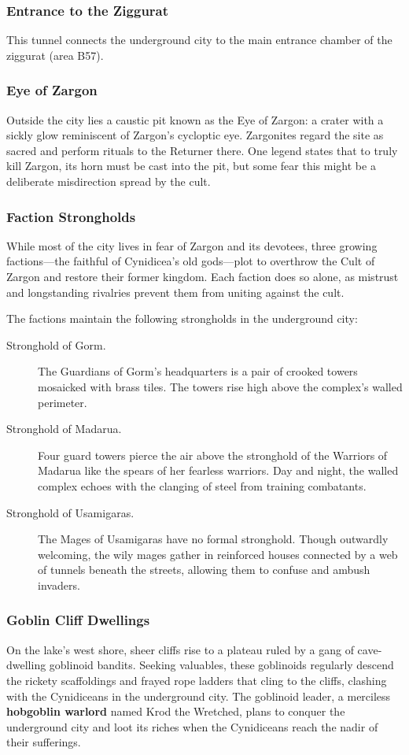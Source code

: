 \documentclass[10pt,a4paper,twoside,bg=print,twocolumn,openany,nodeprecatedcode]{dndbook}
\begin{document}
\subsubsection{Entrance to the Ziggurat}
This tunnel connects the underground city to the main entrance chamber of the ziggurat (area B57).

\subsubsection{Eye of Zargon}
Outside the city lies a caustic pit known as the Eye of Zargon: a crater with a sickly glow reminiscent of Zargon's cycloptic eye. Zargonites regard the site as sacred and perform rituals to the Returner there. One legend states that to truly kill Zargon, its horn must be cast into the pit, but some fear this might be a deliberate misdirection spread by the cult.

\subsubsection{Faction Strongholds}
While most of the city lives in fear of Zargon and its devotees, three growing factions—the faithful of Cynidicea's old gods—plot to overthrow the Cult of Zargon and restore their former kingdom. Each faction does so alone, as mistrust and longstanding rivalries prevent them from uniting against the cult.

The factions maintain the following strongholds in the underground city:


\begin{description}
\item[Stronghold of Gorm.]
The Guardians of Gorm's headquarters is a pair of crooked towers mosaicked with brass tiles. The towers rise high above the complex's walled perimeter.
\item[Stronghold of Madarua.]
Four guard towers pierce the air above the stronghold of the Warriors of Madarua like the spears of her fearless warriors. Day and night, the walled complex echoes with the clanging of steel from training combatants.
\item[Stronghold of Usamigaras.]
The Mages of Usamigaras have no formal stronghold. Though outwardly welcoming, the wily mages gather in reinforced houses connected by a web of tunnels beneath the streets, allowing them to confuse and ambush invaders.
\end{description}

\subsubsection{Goblin Cliff Dwellings}
On the lake's west shore, sheer cliffs rise to a plateau ruled by a gang of cave-dwelling goblinoid bandits. Seeking valuables, these goblinoids regularly descend the rickety scaffoldings and frayed rope ladders that cling to the cliffs, clashing with the Cynidiceans in the underground city. The goblinoid leader, a merciless \textbf{hobgoblin warlord} named Krod the Wretched, plans to conquer the underground city and loot its riches when the Cynidiceans reach the nadir of their sufferings.
\end{document}
